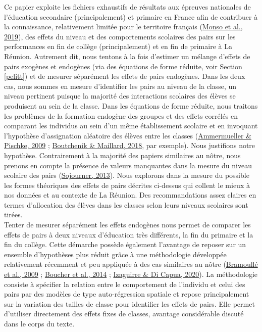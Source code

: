 \documentclass[
]{book}
\begin{document}
\quad Ce papier exploite les fichiers exhaustifs de résultats aux épreuves nationales de l'éducation secondaire (principalement) et primaire en France afin de contribuer à la connaissance, relativement limitée pour le territoire français (\protect\hyperlink{ref-MON:eal:19}{Monso et al., 2019}), des effets du niveau et des comportements scolaires des pairs sur les performances en fin de collège (principalement) et en fin de primaire à La Réunion. Autrement dit, nous tentons à la fois d'estimer un mélange d'effets de pairs exogènes et endogènes (via des équations de forme réduite, voir Section \ref{pelitt}) et de mesurer séparément les effets de pairs endogènes. Dans les deux cas, nous sommes en mesure d'identifier les pairs au niveau de la classe, un niveau pertinent puisque la majorité des interactions scolaires des élèves se produisent au sein de la classe. Dans les équations de forme réduite, nous traitons les problèmes de la formation endogène des groupes et des effets corrélés en comparant les individus au sein d'un même établissement scolaire et en invoquant l'hypothèse d'assignation aléatoire des élèves entre les classes (\protect\hyperlink{ref-AMM:PIS:09}{Ammermueller \& Pischke, 2009} ; \protect\hyperlink{ref-BOU:MAI:18}{Boutchenik \& Maillard, 2018}, par exemple). Nous justifions notre hypothèse. Contrairement à la majorité des papiers similaires au nôtre, nous prenons en compte la présence de valeurs manquantes dans la mesure du niveau scolaire des pairs (\protect\hyperlink{ref-SOJ:13}{Sojourner, 2013}). Nous explorons dans la mesure du possible les formes théoriques des effets de pairs décrites ci-dessus qui collent le mieux à nos données et au contexte de La Réunion. Des recommandations assez claires en termes d'allocation des élèves dans les classes selon leurs niveaux scolaires sont tirées.\\
Tenter de mesurer séparément les effets endogènes nous permet de comparer les effets de pairs à deux niveaux d'éducation très différents, la fin du primaire et la fin du collège. Cette démarche possède également l'avantage de reposer sur un ensemble d'hypothèses plus réduit grâce à une méthodologie développée relativement récemment et peu appliquée à des cas similaires au nôtre (\protect\hyperlink{ref-BRA:eal:09}{Bramoullé et al., 2009} ; \protect\hyperlink{ref-BOU:eal:14}{Boucher et al., 2014} ; \protect\hyperlink{ref-IZA:DIC:20}{Izaguirre \& Di Capua, 2020}). La méthodologie consiste à spécifier la relation entre le comportement de l'individu et celui des pairs par des modèles de type auto-régression spatiale et repose principalement sur la variation des tailles de classe pour identifier les effets de pairs. Elle permet d'utiliser directement des effets fixes de classes, avantage considérable discuté dans le corps du texte.
\end{document}
